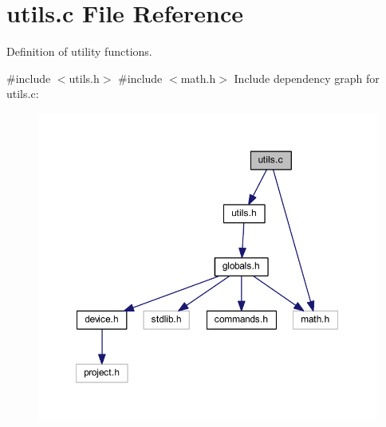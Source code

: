 \section{utils.\+c File Reference}
\label{utils_8c}


Definition of utility functions.  


{\ttfamily \#include $<$utils.\+h$>$}\newline
{\ttfamily \#include $<$math.\+h$>$}\newline
Include dependency graph for utils.\+c\+:
\nopagebreak
\begin{figure}[H]
\begin{center}
\leavevmode
\includegraphics[width=350pt]{utils_8c__incl}
\end{center}
\end{figure}
